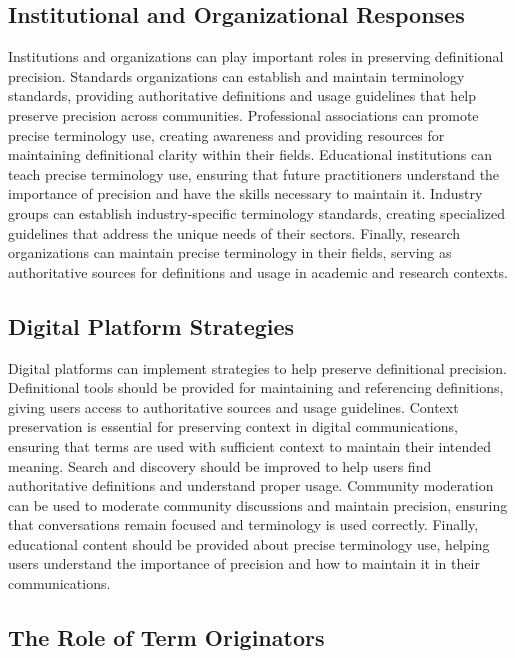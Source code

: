 \documentclass[11pt]{article}
\begin{document}
\subsection{Institutional and Organizational Responses}

Institutions and organizations can play important roles in preserving definitional precision. Standards organizations can establish and maintain terminology standards, providing authoritative definitions and usage guidelines that help preserve precision across communities. Professional associations can promote precise terminology use, creating awareness and providing resources for maintaining definitional clarity within their fields. Educational institutions can teach precise terminology use, ensuring that future practitioners understand the importance of precision and have the skills necessary to maintain it. Industry groups can establish industry-specific terminology standards, creating specialized guidelines that address the unique needs of their sectors. Finally, research organizations can maintain precise terminology in their fields, serving as authoritative sources for definitions and usage in academic and research contexts.

\subsection{Digital Platform Strategies}

Digital platforms can implement strategies to help preserve definitional precision. Definitional tools should be provided for maintaining and referencing definitions, giving users access to authoritative sources and usage guidelines. Context preservation is essential for preserving context in digital communications, ensuring that terms are used with sufficient context to maintain their intended meaning. Search and discovery should be improved to help users find authoritative definitions and understand proper usage. Community moderation can be used to moderate community discussions and maintain precision, ensuring that conversations remain focused and terminology is used correctly. Finally, educational content should be provided about precise terminology use, helping users understand the importance of precision and how to maintain it in their communications.

\subsection{The Role of Term Originators}
\end{document}
